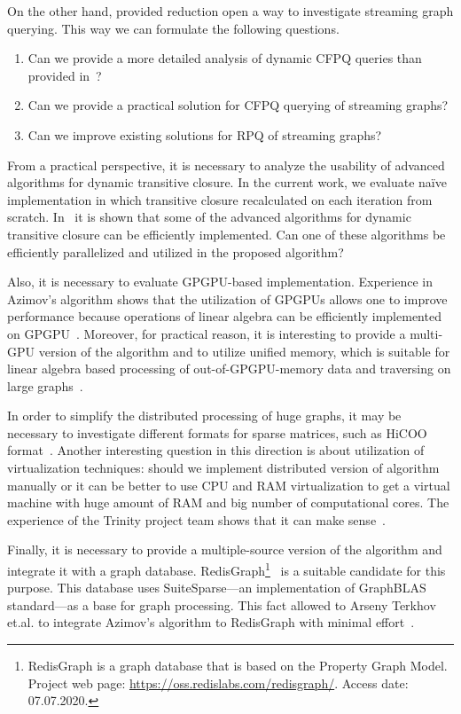 On the other hand, provided reduction open a way to investigate streaming graph querying.
This way we can formulate the following questions.
\begin{enumerate}
\item Can we provide a more detailed analysis of dynamic CFPQ queries than provided in~\cite{10.1007/978-3-662-54458-7_16}?
\item Can we provide a practical solution for CFPQ querying of streaming graphs?
\item Can we improve existing solutions for RPQ of streaming graphs?
\end{enumerate}

From a practical perspective, it is necessary to analyze the usability of advanced algorithms for dynamic transitive closure.
In the current work, we evaluate na{\"i}ve implementation in which transitive closure recalculated on each iteration from scratch.
In~\cite{cs6345} it is shown that some of the advanced algorithms for dynamic transitive closure can be efficiently implemented.
Can one of these algorithms be efficiently parallelized and utilized in the proposed algorithm?

Also, it is necessary to evaluate GPGPU-based implementation.
Experience in Azimov's algorithm shows that the utilization of GPGPUs allows one to improve performance because operations of linear algebra can be efficiently implemented on GPGPU~\cite{Mishin:2019:ECP:3327964.3328503,10.1145/3398682.3399163}. 
Moreover, for practical reason, it is interesting to provide a multi-GPU version of the algorithm and to utilize unified memory, which is suitable for linear algebra based processing of out-of-GPGPU-memory data and traversing on large graphs~\cite{8946118,10.14778/3384345.3384358}.

In order to simplify the distributed processing of huge graphs, it may be necessary to investigate different formats for sparse matrices, such as HiCOO format~\cite{10.5555/3291656.3291682}. 
Another interesting question in this direction is about utilization of virtualization techniques: should we implement distributed version of algorithm manually or it can be better to use CPU and RAM virtualization to get a virtual machine with huge amount of RAM and big number of computational cores. 
The experience of the Trinity project team shows that it can make sense~\cite{10.1145/2463676.2467799}. 

Finally, it is necessary to provide a multiple-source version of the algorithm and integrate it with a graph database.
RedisGraph\footnote{RedisGraph is a graph database that is based on the Property Graph
Model. Project web page: \url{https://oss.redislabs.com/redisgraph/}. Access date:
07.07.2020.}~\cite{8778293} is a suitable candidate for this purpose.
This database uses SuiteSparse---an implementation of GraphBLAS standard---as a base for graph processing.
This fact allowed to Arseny Terkhov et.al.  to integrate Azimov's algorithm to RedisGraph with minimal effort~\cite{10.1145/3398682.3399163}.
